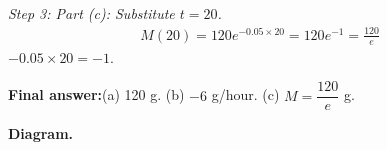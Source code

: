 \documentclass[11pt]{article}
\begin{document}
\textit{Step 3: Part (c): Substitute \( t = 20 \).}
\[\begin{gathered}
M(20) = 120e^{-0.05 \times 20} = 120e^{-1} = \frac{120}{e}
\end{gathered}\]
\( -0.05 \times 20 = -1 \).

\begin{answerbox}
\textbf{Final answer:}\quad (a) 120 g. (b) \(\displaystyle  -6 \) g/hour. (c) \(\displaystyle  M = \dfrac{120}{e} \) g.
\end{answerbox}
\textbf{Diagram.}

\begin{center}
\end{center}
\end{document}
